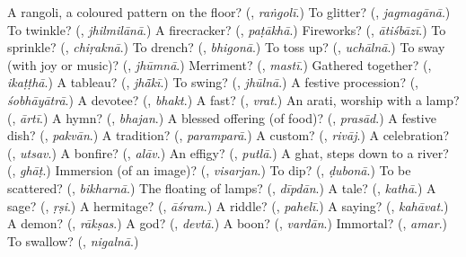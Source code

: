 \begin{tcolorbox}[breakable,colback=teal!4,colframe=teal!35!black,title={Before you move on}]
A rangoli, a coloured pattern on the floor? (\textbf{}, \emph{raṅgolī}.) To glitter? (\textbf{}, \emph{jagmagānā}.) To twinkle? (\textbf{}, \emph{jhilmilānā}.) A firecracker? (\textbf{}, \emph{paṭākhā}.) Fireworks? (\textbf{}, \emph{ātiśbāzī}.) To sprinkle? (\textbf{}, \emph{chiṛaknā}.) To drench? (\textbf{}, \emph{bhigonā}.) To toss up? (\textbf{}, \emph{uchālnā}.) To sway (with joy or music)? (\textbf{}, \emph{jhūmnā}.) Merriment? (\textbf{}, \emph{mastī}.) Gathered together? (\textbf{}, \emph{ikaṭṭhā}.) A tableau? (\textbf{}, \emph{jhā̃kī}.) To swing? (\textbf{}, \emph{jhūlnā}.) A festive procession? (\textbf{}, \emph{śobhāyātrā}.) A devotee? (\textbf{}, \emph{bhakt}.) A fast? (\textbf{}, \emph{vrat}.) An arati, worship with a lamp? (\textbf{}, \emph{ārtī}.) A hymn? (\textbf{}, \emph{bhajan}.) A blessed offering (of food)? (\textbf{}, \emph{prasād}.) A festive dish? (\textbf{}, \emph{pakvān}.) A tradition? (\textbf{}, \emph{paramparā}.) A custom? (\textbf{}, \emph{rivāj}.) A celebration? (\textbf{}, \emph{utsav}.) A bonfire? (\textbf{}, \emph{alāv}.) An effigy? (\textbf{}, \emph{putlā}.) A ghat, steps down to a river? (\textbf{}, \emph{ghāṭ}.) Immersion (of an image)? (\textbf{}, \emph{visarjan}.) To dip? (\textbf{}, \emph{ḍubonā}.) To be scattered? (\textbf{}, \emph{bikharnā}.) The floating of lamps? (\textbf{}, \emph{dīpdān}.) A tale? (\textbf{}, \emph{kathā}.) A sage? (\textbf{}, \emph{ṛṣi}.) A hermitage? (\textbf{}, \emph{āśram}.) A riddle? (\textbf{}, \emph{pahelī}.) A saying? (\textbf{}, \emph{kahāvat}.) A demon? (\textbf{}, \emph{rākṣas}.) A god? (\textbf{}, \emph{devtā}.) A boon? (\textbf{}, \emph{vardān}.) Immortal? (\textbf{}, \emph{amar}.) To swallow? (\textbf{}, \emph{nigalnā}.)
\end{tcolorbox}
